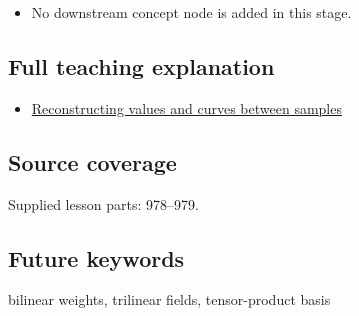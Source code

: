 \begin{itemize}
\tightlist
\item
  No downstream concept node is added in this stage.
\end{itemize}

\subsection{Full teaching explanation}\label{appendix-0a09b6dfdc86-full-teaching-explanation}

\begin{itemize}
\tightlist
\item
  \hyperref[02-foundations-ii-ch028-reconstructing-values-and-curves-between-samples]{Reconstructing values and curves between samples}
\end{itemize}

\subsection{Source coverage}\label{appendix-0a09b6dfdc86-source-coverage}

Supplied lesson parts: 978--979.

\subsection{Future keywords}\label{appendix-0a09b6dfdc86-future-keywords}

bilinear weights, trilinear fields, tensor-product basis

